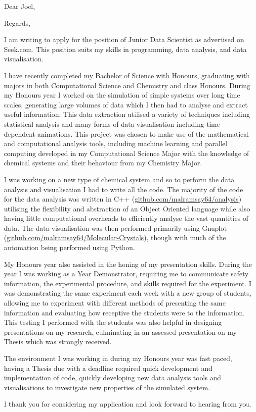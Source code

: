 


\recipient{~}{~}
\date{\today}
\opening{Dear Joel,}
\closing{Regards,}



\makelettertitle

I am writing to apply for the position of Junior Data Scientist as advertised on Seek.com. This position suits my skills in programming, data analysis, and data visualisation.

I have recently completed my Bachelor of Science with Honours, graduating with majors in both Computational Science and Chemistry and  class Honours. During my Honours year I worked on the simulation of simple systems over long time scales, generating large volumes of data which I then had to analyse and extract useful information. This data extraction utilised a variety of techniques including statistical analysis and many forms of data visualisation including time dependent animations. This project was chosen to make use of the mathematical and computational analysis tools, including machine learning and parallel computing developed in my Computational Science Major with the knowledge of chemical systems and their behaviour from my Chemistry Major.

I was working on a new type of chemical system and so to perform the data analysis and visualisation I had to write all the code. The majority of the code for the data analysis was written in C++ (\href{https://github.com/malramsay64/analysis}{github.com/malramsay64/analysis}) utilising the flexibility and abstraction of an Object Oriented language while also having little computational overheads to efficiently analyse the vast quantities of data. The data visualisation was then performed primarily using Gnuplot (\href{https://github.com/malramsay64/Molecular-Crystals}{github.com/malramsay64/Molecular-Crystals}), though with much of the automation being performed using Python.

My Honours year also assisted in the honing of my presentation skills. During the year I was working as a  Year Demonstrator, requiring me to communicate safety information, the experimental procedure, and skills required for the experiment. I was demonstrating the same experiment each week with a new group of students, allowing me to experiment with different methods of presenting the same information and evaluating how receptive the students were to the information. This testing I performed with the students was also helpful in designing presentations on my research, culminating in an assessed presentation on my Thesis which was strongly received.

The environment I was working in during my Honours year was fast paced, having a Thesis due with a deadline required quick development and implementation of code, quickly developing new data analysis tools and visualisations to investigate new properties of the simulated system.

I thank you for considering my application and look forward to hearing from you.

\makeletterclosing


